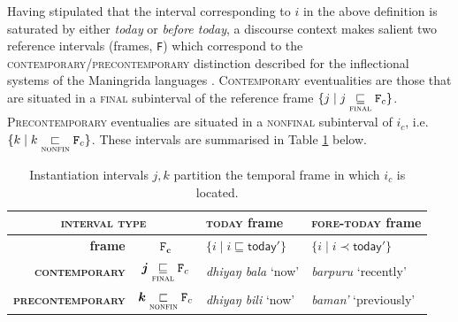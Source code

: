 %






Having stipulated that the interval corresponding to $ i $ in the above definition is saturated by either \textsl{today} or \textsl{before today}, a discourse context makes salient two reference intervals (frames, \texttt{F}) which correspond to the \textsc{contemporary\slash{}precontemporary} distinction described for the inflectional systems of the Maningrida languages \citep{Glasgow1964,Eather2011,Green1995}. \textsc{Contemporary} eventualities are those that are situated in a \textsc{final} subinterval of the reference frame $ \{j\mid j\underset{\textsc{final}}\sqsubseteq \mathtt{F}_c\} $. \textsc{Precontemporary} eventualies are situated in a \textsc{nonfinal} subinterval of $ i_c $, i.e. $ \{k\mid k\underset{\textsc{nonfin}}{\sqsubset}\mathtt{F}_c\}$. These intervals are summarised in Table \ref{InstInts} below.


\begin{table}[h]
	\caption[How to partition a temporal frame]{Instantiation intervals $ j,k $ partition the temporal frame in which $ i_c $ is located.}\centering\label{InstInts}
\begingroup	\renewcommand{\arraystretch}{1.75} 
	\begin{tabular}{rc|ll}\toprule
		\multicolumn{2}{c}{\textsc{\textbf{interval type}}} & \textsc{today} frame & \textsc{fore-today} frame\\\midrule
		\textbf{frame} &$ \boldsymbol{\mathtt{F}_c} $ & $\{i\mid i\sqsubseteq\mathsf{today'}\}$ & $\{i\mid i\prec\mathsf{today'}\} $	\\%
		{\color{forest}\textbf{\textsc{contemporary}}} &$\boldsymbol j\underset{\textsc{final}}{\sqsubseteq}\mathtt{F}_c $ & \textit{dhiyaŋ bala} `now' & \textit{barpuru} `recently'	\\
		{\color{blue}\textbf{\textsc{precontemporary}}} &$ \boldsymbol k\underset{\textsc{nonfin}}{\sqsubset}\mathtt{F}_c $	& \textit{dhiyaŋ bili} `now' & \textit{baman'} `previously'	\\\bottomrule
	\end{tabular}\endgroup
\end{table}



